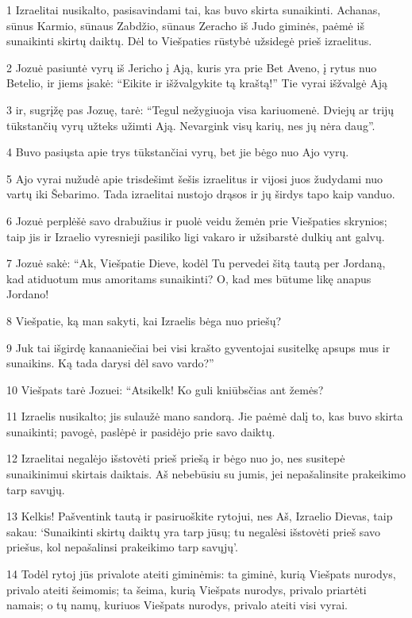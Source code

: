 \par 1 Izraelitai nusikalto, pasisavindami tai, kas buvo skirta sunaikinti. Achanas, sūnus Karmio, sūnaus Zabdžio, sūnaus Zeracho iš Judo giminės, paėmė iš sunaikinti skirtų daiktų. Dėl to Viešpaties rūstybė užsidegė prieš izraelitus. 
\par 2 Jozuė pasiuntė vyrų iš Jericho į Ają, kuris yra prie Bet Aveno, į rytus nuo Betelio, ir jiems įsakė: “Eikite ir išžvalgykite tą kraštą!” Tie vyrai išžvalgė Ają 
\par 3 ir, sugrįžę pas Jozuę, tarė: “Tegul nežygiuoja visa kariuomenė. Dviejų ar trijų tūkstančių vyrų užteks užimti Ają. Nevargink visų karių, nes jų nėra daug”. 
\par 4 Buvo pasiųsta apie trys tūkstančiai vyrų, bet jie bėgo nuo Ajo vyrų. 
\par 5 Ajo vyrai nužudė apie trisdešimt šešis izraelitus ir vijosi juos žudydami nuo vartų iki Šebarimo. Tada izraelitai nustojo drąsos ir jų širdys tapo kaip vanduo. 
\par 6 Jozuė perplėšė savo drabužius ir puolė veidu žemėn prie Viešpaties skrynios; taip jis ir Izraelio vyresnieji pasiliko ligi vakaro ir užsibarstė dulkių ant galvų. 
\par 7 Jozuė sakė: “Ak, Viešpatie Dieve, kodėl Tu pervedei šitą tautą per Jordaną, kad atiduotum mus amoritams sunaikinti? O, kad mes būtume likę anapus Jordano! 
\par 8 Viešpatie, ką man sakyti, kai Izraelis bėga nuo priešų? 
\par 9 Juk tai išgirdę kanaaniečiai bei visi krašto gyventojai susitelkę apsups mus ir sunaikins. Ką tada darysi dėl savo vardo?” 
\par 10 Viešpats tarė Jozuei: “Atsikelk! Ko guli kniūbsčias ant žemės? 
\par 11 Izraelis nusikalto; jis sulaužė mano sandorą. Jie paėmė dalį to, kas buvo skirta sunaikinti; pavogė, paslėpė ir pasidėjo prie savo daiktų. 
\par 12 Izraelitai negalėjo išstovėti prieš priešą ir bėgo nuo jo, nes susitepė sunaikinimui skirtais daiktais. Aš nebebūsiu su jumis, jei nepašalinsite prakeikimo tarp savųjų. 
\par 13 Kelkis! Pašventink tautą ir pasiruoškite rytojui, nes Aš, Izraelio Dievas, taip sakau: ‘Sunaikinti skirtų daiktų yra tarp jūsų; tu negalėsi išstovėti prieš savo priešus, kol nepašalinsi prakeikimo tarp savųjų’. 
\par 14 Todėl rytoj jūs privalote ateiti giminėmis: ta giminė, kurią Viešpats nurodys, privalo ateiti šeimomis; ta šeima, kurią Viešpats nurodys, privalo priartėti namais; o tų namų, kuriuos Viešpats nurodys, privalo ateiti visi vyrai. 
